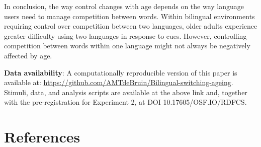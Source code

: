 \documentclass[
]{article}
\begin{document}
In conclusion, the way control changes with age depends on the way language users need to manage competition between words. Within bilingual environments requiring control over competition between two languages, older adults experience greater difficulty using two languages in response to cues. However, controlling competition between words within one language might not always be negatively affected by age.

\newpage

\textbf{Data availability}:
A computationally reproducible version of this paper is available at: \url{https://github.com/AMTdeBruin/Bilingual-switching-ageing}.
Stimuli, data, and analysis scripts are available at the above link and, together with the pre-registration for Experiment 2, at DOI 10.17605/OSF.IO/RDFCS.

\newpage

\hypertarget{references}{%
\section*{References}\label{references}}
\end{document}
